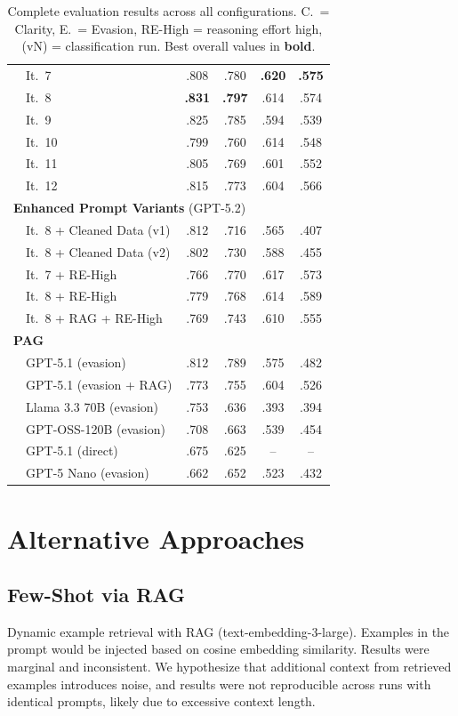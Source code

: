 \documentclass[11pt]{article}
\begin{document}
\begin{table}[p]
\begin{tabular*}{\textwidth}{@{\extracolsep{\fill}}llcccc@{}}
 & It.~7 & .808 & .780 & \textbf{.620} & \textbf{.575} \\
 & It.~8 & \textbf{.831} & \textbf{.797} & .614 & .574 \\
 & It.~9 & .825 & .785 & .594 & .539 \\
 & It.~10 & .799 & .760 & .614 & .548 \\
 & It.~11 & .805 & .769 & .601 & .552 \\
 & It.~12 & .815 & .773 & .604 & .566 \\
\midrule
\multicolumn{6}{l}{\textbf{Enhanced Prompt Variants} (GPT-5.2)} \\
\midrule
 & It.~8 + Cleaned Data (v1) & .812 & .716 & .565 & .407 \\
 & It.~8 + Cleaned Data (v2) & .802 & .730 & .588 & .455 \\
 & It.~7 + RE-High & .766 & .770 & .617 & .573 \\
 & It.~8 + RE-High & .779 & .768 & .614 & .589 \\
 & It.~8 + RAG + RE-High & .769 & .743 & .610 & .555 \\
\midrule
\multicolumn{6}{l}{\textbf{PAG} \citep{yadav2024pag}} \\
\midrule
 & GPT-5.1 (evasion) & .812 & .789 & .575 & .482 \\
 & GPT-5.1 (evasion + RAG) & .773 & .755 & .604 & .526 \\
 & Llama 3.3 70B (evasion) & .753 & .636 & .393 & .394 \\
 & GPT-OSS-120B (evasion) & .708 & .663 & .539 & .454 \\
 & GPT-5.1 (direct) & .675 & .625 & -- & -- \\
 & GPT-5 Nano (evasion) & .662 & .652 & .523 & .432 \\
\bottomrule
\end{tabular*}
\caption{Complete evaluation results across all configurations. C.~= Clarity, E.~= Evasion, RE-High = reasoning effort high, (vN) = classification run. Best overall values in \textbf{bold}.}
\label{tab:all-results}
\end{table}

\section{Alternative Approaches}
\label{sec:appendix-alternatives}

\subsection{Few-Shot via RAG}
Dynamic example retrieval with RAG (text-embedding-3-large). Examples in the prompt would be injected based on cosine embedding similarity.
Results were marginal and inconsistent.
We hypothesize that additional context from retrieved examples introduces noise, and results were not reproducible across runs with identical prompts, likely due to excessive context length.
\end{document}
